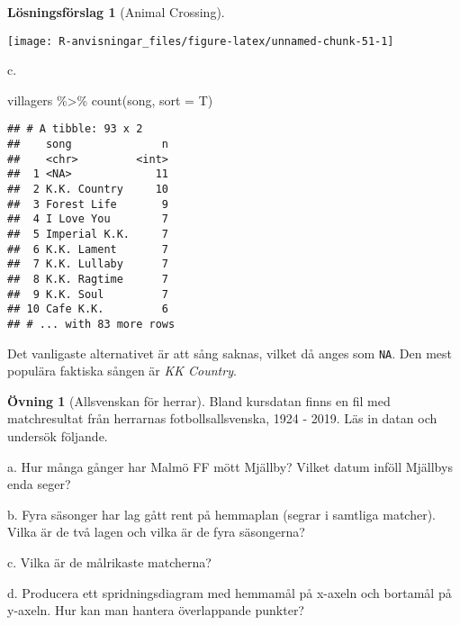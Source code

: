 \documentclass[
]{book}
\newenvironment{Shaded}{\begin{snugshade}}{\end{snugshade}}
\newcommand{\AttributeTok}[1]{\textcolor[rgb]{0.77,0.63,0.00}{#1}}
\newcommand{\FunctionTok}[1]{\textcolor[rgb]{0.00,0.00,0.00}{#1}}
\newcommand{\NormalTok}[1]{#1}
\newcommand{\SpecialCharTok}[1]{\textcolor[rgb]{0.00,0.00,0.00}{#1}}
\theoremstyle{definition}
\theoremstyle{definition}
\theoremstyle{definition}
\newtheorem{exercise}{Övning}[chapter]
\theoremstyle{definition}
\newtheorem{hypothesis}{Lösningsförslag}[chapter]
\theoremstyle{remark}
\begin{document}
\begin{hypothesis}[Animal Crossing]
\begin{center}\texttt{[image: R-anvisningar\_files/figure-latex/unnamed-chunk-51-1]} \end{center}

c.

\begin{Shaded}
\begin{Highlighting}[]
\NormalTok{villagers }\SpecialCharTok{\%\textgreater{}\%} 
  \FunctionTok{count}\NormalTok{(song, }\AttributeTok{sort =}\NormalTok{ T)}
\end{Highlighting}
\end{Shaded}

\begin{verbatim}
## # A tibble: 93 x 2
##    song              n
##    <chr>         <int>
##  1 <NA>             11
##  2 K.K. Country     10
##  3 Forest Life       9
##  4 I Love You        7
##  5 Imperial K.K.     7
##  6 K.K. Lament       7
##  7 K.K. Lullaby      7
##  8 K.K. Ragtime      7
##  9 K.K. Soul         7
## 10 Cafe K.K.         6
## # ... with 83 more rows
\end{verbatim}

Det vanligaste alternativet är att sång saknas, vilket då anges som \texttt{NA}. Den mest populära faktiska sången är \emph{KK Country}.
\end{hypothesis}

\begin{exercise}[Allsvenskan för herrar]
Bland kursdatan finns en fil med matchresultat från herrarnas fotbollsallsvenska, 1924 - 2019. Läs in datan och undersök följande.

a. Hur många gånger har Malmö FF mött Mjällby? Vilket datum inföll Mjällbys enda seger?

b. Fyra säsonger har lag gått rent på hemmaplan (segrar i samtliga matcher). Vilka är de två lagen och vilka är de fyra säsongerna?

c. Vilka är de målrikaste matcherna?

d. Producera ett spridningsdiagram med hemmamål på x-axeln och bortamål på y-axeln. Hur kan man hantera överlappande punkter?
\end{exercise}
\end{document}
